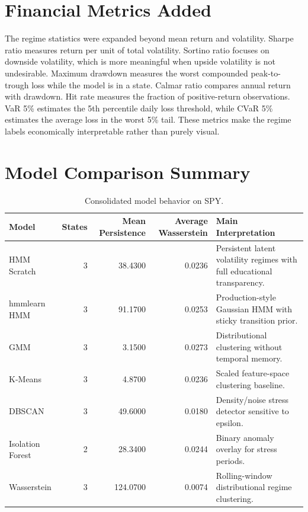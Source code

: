 \documentclass[12pt,a4paper]{article}
\begin{document}
\section{Financial Metrics Added}
The regime statistics were expanded beyond mean return and volatility. Sharpe ratio measures return per unit of total volatility. Sortino ratio focuses on downside volatility, which is more meaningful when upside volatility is not undesirable. Maximum drawdown measures the worst compounded peak-to-trough loss while the model is in a state. Calmar ratio compares annual return with drawdown. Hit rate measures the fraction of positive-return observations. VaR 5\% estimates the 5th percentile daily loss threshold, while CVaR 5\% estimates the average loss in the worst 5\% tail. These metrics make the regime labels economically interpretable rather than purely visual.

\section{Model Comparison Summary}
\begin{table}[H]
\centering
\caption{Consolidated model behavior on SPY.}
\small
\begin{tabular}{lrrrp{}}
\toprule
Model & States & Mean Persistence & Average Wasserstein & Main Interpretation \\
\midrule
HMM Scratch & 3 & 38.4300 & 0.0236 & Persistent latent volatility regimes with full educational transparency. \\
hmmlearn HMM & 3 & 91.1700 & 0.0253 & Production-style Gaussian HMM with sticky transition prior. \\
GMM & 3 & 3.1500 & 0.0273 & Distributional clustering without temporal memory. \\
K-Means & 3 & 4.8700 & 0.0236 & Scaled feature-space clustering baseline. \\
DBSCAN & 3 & 49.6000 & 0.0180 & Density/noise stress detector sensitive to epsilon. \\
Isolation Forest & 2 & 28.3400 & 0.0244 & Binary anomaly overlay for stress periods. \\
Wasserstein & 3 & 124.0700 & 0.0074 & Rolling-window distributional regime clustering. \\
\bottomrule
\end{tabular}
\end{table}
\end{document}
